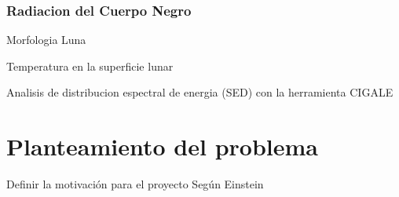 \documentclass[12pt]{article}
\begin{document}
\subsubsection{Radiacion del Cuerpo Negro}
Morfologia Luna \cite{PhysicsandAstronomyMoon}

Temperatura en la superficie lunar \cite{Zhengling2024}

Analisis de distribucion espectral de energia (SED) con la herramienta CIGALE \cite{Boquien2019}

\section{Planteamiento del problema}
Definir la motivación para el proyecto Según Einstein

\printbibliography[]
\end{document}
